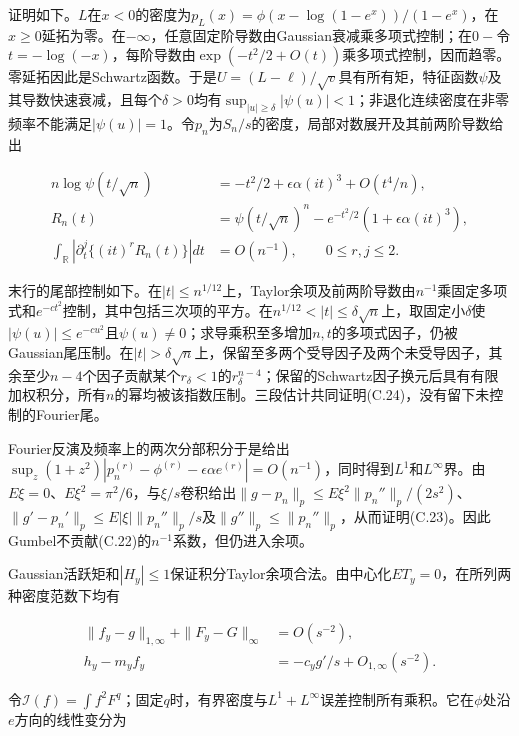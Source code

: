 \documentclass[11pt,a4paper]{article}
\begin{document}
证明如下。\(L\)在\(x<0\)的密度为\(p_L(x)=\phi(x-\log(1-e^x))/(1-e^x)\)，在\(x\ge0\)延拓为零。在\(-\infty\)，任意固定阶导数由Gaussian衰减乘多项式控制；在\(0-\)令\(t=-\log(-x)\)，每阶导数由\(\exp(-t^2/2+O(t))\)乘多项式控制，因而趋零。零延拓因此是Schwartz函数。于是\(U=(L-\ell)/\sqrt v\)具有所有矩，特征函数\(\psi\)及其导数快速衰减，且每个\(\delta>0\)均有\(\sup_{|u|\ge\delta}|\psi(u)|<1\)；非退化连续密度在非零频率不能满足\(|\psi(u)|=1\)。令\(p_n\)为\(S_n/s\)的密度，局部对数展开及其前两阶导数给出

\[
\begin{aligned}
n\log\psi(t/\sqrt n)&=-t^2/2+\epsilon\alpha(it)^3+O(t^4/n),\\
R_n(t)&=\psi(t/\sqrt n)^n-e^{-t^2/2}(1+\epsilon\alpha(it)^3),\\
\int_{\mathbb R}\left|\partial_t^j\{(it)^rR_n(t)\}\right|dt
&=O(n^{-1}),\qquad 0\le r,j\le2.
\end{aligned}
\tag{C.24}
\]

末行的尾部控制如下。在\(|t|\le n^{1/12}\)上，Taylor余项及前两阶导数由\(n^{-1}\)乘固定多项式和\(e^{-ct^2}\)控制，其中包括三次项的平方。在\(n^{1/12}<|t|\le\delta\sqrt n\)上，取固定小\(\delta\)使\(|\psi(u)|\le e^{-cu^2}\)且\(\psi(u)\ne0\)；求导乘积至多增加\(n,t\)的多项式因子，仍被Gaussian尾压制。在\(|t|>\delta\sqrt n\)上，保留至多两个受导因子及两个未受导因子，其余至少\(n-4\)个因子贡献某个\(r_\delta<1\)的\(r_\delta^{n-4}\)；保留的Schwartz因子换元后具有有限加权积分，所有\(n\)的幂均被该指数压制。三段估计共同证明(C.24)，没有留下未控制的Fourier尾。

Fourier反演及频率上的两次分部积分于是给出\(\sup_z(1+z^2)|p_n^{(r)}-\phi^{(r)}-\epsilon\alpha e^{(r)}|=O(n^{-1})\)，同时得到\(L^1\)和\(L^\infty\)界。由\(E\xi=0\)、\(E\xi^2=\pi^2/6\)，与\(\xi/s\)卷积给出\(\|g-p_n\|_p\le E\xi^2\|p_n''\|_p/(2s^2)\)、\(\|g'-p_n'\|_p\le E|\xi|\|p_n''\|_p/s\)及\(\|g''\|_p\le\|p_n''\|_p\)，从而证明(C.23)。因此Gumbel不贡献(C.22)的\(n^{-1}\)系数，但仍进入余项。

Gaussian活跃矩和\(|H_y|\le1\)保证积分Taylor余项合法。由中心化\(ET_y=0\)，在所列两种密度范数下均有

\[
\begin{aligned}
\|f_y-g\|_{1,\infty}+\|F_y-G\|_\infty&=O(s^{-2}),\\
h_y-m_yf_y&=-c_yg'/s+O_{1,\infty}(s^{-2}).
\end{aligned}
\tag{C.25}
\]

令\(\mathcal I(f)=\int f^2F^q\)；固定\(q\)时，有界密度与\(L^1+L^\infty\)误差控制所有乘积。它在\(\phi\)处沿\(e\)方向的线性变分为
\end{document}
